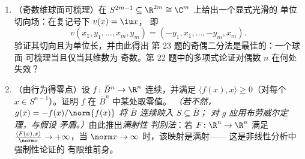 \begin{problem}
\begin{enumerate}[resume]
  \item （奇数维球面可梳理）在 $S^{2m-1}
        \subseteq \R^{2m} \cong \C^m$ 上给出一个显式光滑的
        单位切向场：在复记号下 $v(x) = \iu x$，
        即
        \[
        v(x_1, y_1, \dots, x_m, y_m) =
        (-y_1, x_1, \dots, -y_m, x_m) .
        \]
        验证其切向且为单位长，并由此得出
        第 23 题的奇偶二分法是最佳的：一个球面
        可梳理当且仅当其维数为
        奇数。第
        22 题中的多项式论证对偶数 $n$ 在何处失效？
  \item （由行为得零点）设 $f \colon \bar
        B^n \to \R^n$ 连续，并满足 $\langle f(x),
        x\rangle \geq 0$（对每个 $x \in S^{n-1}$）。证明
        $f$ 在 $\bar B^n$ 中某处取零值。
        \emph{（若不然，$g(x) = -f(x)/\norm{f(x)}$ 将
        $\bar B$ 连续映入 $S \subseteq \bar B$；
        对 $g$ 应用布劳威尔定理，与假设
        矛盾。）}由此推出\emph{满射性
        判别法}：若 $F\colon\R^n\to\R^n$ 满足
        $\frac{\langle F(x), x\rangle}{\norm x} \to
        +\infty$，当 $\norm x \to \infty$ 时，该映射是满射——
        这是非线性分析中强制性论证的
        有限维前身。
\end{enumerate}
\end{problem}
